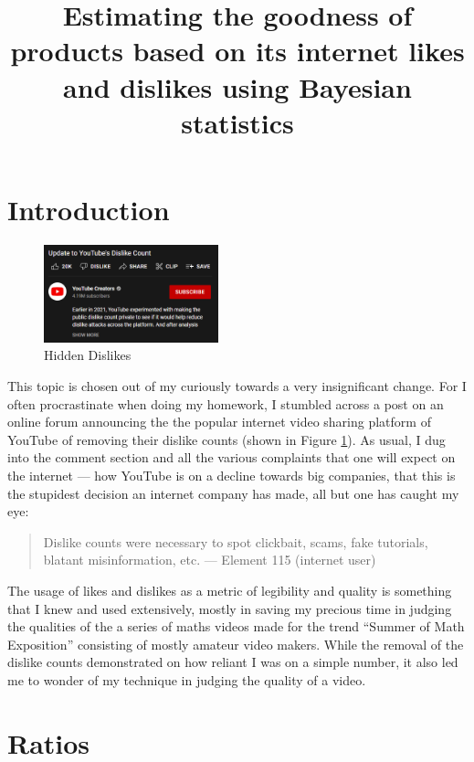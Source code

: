 \documentclass[a4paper,11pt]{article}
\title{Estimating the goodness of products based on its internet likes and dislikes using Bayesian statistics}
\author{}
\date{\vspace{-8ex}}
\begin{document}
\maketitle

\section{Introduction}

\begin{figure}
    \centering
    \includegraphics[width=0.45\textwidth]{assets/intro.png}
    \caption{Hidden Dislikes}
    \label{fig:hidden}
\end{figure}

This topic is chosen out of my curiously towards a very insignificant change. For I often procrastinate when doing my homework, I stumbled across a post on an online forum announcing the the popular internet video sharing platform of YouTube of removing their dislike counts (shown in Figure \ref{fig:hidden}). As usual, I dug into the comment section and all the various complaints that one will expect on the internet --- how YouTube is on a decline towards big companies, that this is the stupidest decision an internet company has made, all but one has caught my eye:

\begin{quote}
    Dislike counts were necessary to spot clickbait, scams, fake tutorials, blatant misinformation, etc. --- Element 115 (internet user)
\end{quote}

The usage of likes and dislikes as a metric of legibility and quality is something that I knew and used extensively, mostly in saving my precious time in judging the qualities of the a series of maths videos made for the trend ``Summer of Math Exposition'' consisting of mostly amateur video makers. While the removal of the dislike counts demonstrated on how reliant I was on a simple number, it also led me to wonder of my technique in judging the quality of a video.


\section{Ratios}
\end{document}
